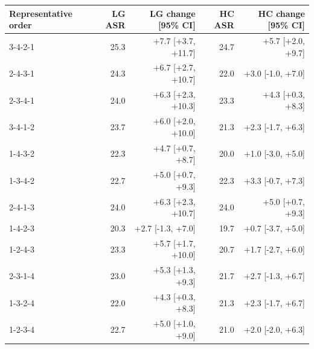 \begin{tabular}{lrrrr}
\toprule
Representative order & LG ASR & LG change [95\% CI] & HC ASR & HC change [95\% CI] \\
\midrule
3-4-2-1 & 25.3 & +7.7 [+3.7, +11.7] & 24.7 & +5.7 [+2.0, +9.7] \\
2-4-3-1 & 24.3 & +6.7 [+2.7, +10.7] & 22.0 & +3.0 [-1.0, +7.0] \\
2-3-4-1 & 24.0 & +6.3 [+2.3, +10.3] & 23.3 & +4.3 [+0.3, +8.3] \\
3-4-1-2 & 23.7 & +6.0 [+2.0, +10.0] & 21.3 & +2.3 [-1.7, +6.3] \\
1-4-3-2 & 22.3 & +4.7 [+0.7, +8.7] & 20.0 & +1.0 [-3.0, +5.0] \\
1-3-4-2 & 22.7 & +5.0 [+0.7, +9.3] & 22.3 & +3.3 [-0.7, +7.3] \\
2-4-1-3 & 24.0 & +6.3 [+2.3, +10.7] & 24.0 & +5.0 [+0.7, +9.3] \\
1-4-2-3 & 20.3 & +2.7 [-1.3, +7.0] & 19.7 & +0.7 [-3.7, +5.0] \\
1-2-4-3 & 23.3 & +5.7 [+1.7, +10.0] & 20.7 & +1.7 [-2.7, +6.0] \\
2-3-1-4 & 23.0 & +5.3 [+1.3, +9.3] & 21.7 & +2.7 [-1.3, +6.7] \\
1-3-2-4 & 22.0 & +4.3 [+0.3, +8.3] & 21.3 & +2.3 [-1.7, +6.7] \\
1-2-3-4 & 22.7 & +5.0 [+1.0, +9.0] & 21.0 & +2.0 [-2.0, +6.3] \\
\bottomrule
\end{tabular}
